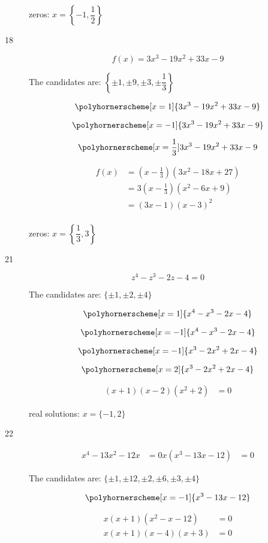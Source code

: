 \documentclass[fleqn,addpoints]{exam}
\begin{document}
\begin{description}
zeros: $x = \left \{ -1, \dfrac{1}{2} \right \}$

\item[18]
\[ 
  f(x) = 3x^3 - 19x^2 + 33x - 9 
\]

The candidates are: $\left \{\pm 1, \pm 9, \pm 3, \pm \dfrac{1}{3} \right \}$

\[ 
  \polyhornerscheme[x=1]{3x^3 - 19x^2 + 33x - 9}
\]

\[ 
  \polyhornerscheme[x=-1]{3x^3 - 19x^2 + 33x - 9}
\]

\[ 
  \polyhornerscheme[x=\frac{1}{3}]{3x^3 - 19x^2 + 33x - 9}
\]

\begin{align*}
  f(x) &=  (x-\frac{1}{3})(3x^2-18x+27) \\
  &=  3(x-\frac{1}{3})(x^2-6x+9) \\
  &=  (3x-1)(x-3)^2 \\
\end{align*}

zeros: $x = \left \{ \dfrac{1}{3}, 3 \right \}$

\item[21]
\[ 
  z^4 - z^3 - 2z - 4 = 0
\]

The candidates are: $\{\pm 1, \pm 2, \pm 4 \}$

\[ 
  \polyhornerscheme[x=1]{x^4 - x^3 - 2x - 4 }
\]

\[ 
  \polyhornerscheme[x=-1]{x^4 - x^3 - 2x - 4 }
\]

\[ 
  \polyhornerscheme[x=-1]{x^3 - 2x^2 + 2x - 4 }
\]

\[ 
  \polyhornerscheme[x=2]{x^3 - 2x^2 + 2x - 4 }
\]

\begin{align*}
  (x+1)(x-2)(x^2+2) &= 0
\end{align*}

real solutions: $x = \{ -1, 2 \}$

\item[22]
\begin{align*}
  x^4 - 13x^2 - 12x &= 0 
  x(x^3 - 13x - 12) &= 0 
\end{align*}

The candidates are: $\{\pm 1, \pm 12, \pm 2, \pm 6, \pm 3, \pm 4\}$

\[ 
  \polyhornerscheme[x=-1]{x^3 - 13x - 12}
\]

\begin{align*}
  x(x+1)(x^2-x-12) &=  0 \\
  x(x+1)(x-4)(x+3) &=  0 \\
\end{align*}


\end{description}
\end{document}
